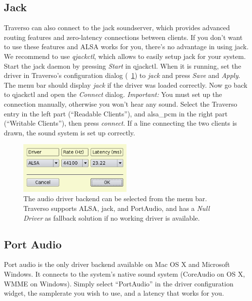 \subsection{Jack}
Traverso can also connect to the jack soundserver, which provides advanced routing features and zero-latency connections between clients. If you don't want to use these features and ALSA works for you, there's no advantage in using jack. We recommend to use \emph{qjackctl}, which allows to easily setup jack for your system. Start the jack daemon by pressing \emph{Start} in qjackctl. When it is running, set the driver in Traverso's configuration dialog (\FigB\ \ref{fig_driverconf}) to \emph{jack} and press \emph{Save} and \emph{Apply}. The menu bar should display \emph{jack} if the driver was loaded correctly. Now go back to qjackctl and open the \emph{Connect} dialog. \emph{Important:} You must set up the connection manually, otherwise you won't hear any sound. Select the Traverso entry in the left part (``Readable Clients''), and alsa\_pcm in the right part (``Writable Clients''), then press \emph{connect}. If a line connecting the two clients is drawn, the sound system is set up correctly.

\begin{figure}
 \centering\includegraphics[width=0.5\textwidth]{images/sshot02.png}
 \caption{The audio driver backend can be selected from the menu bar. Traverso supports ALSA, jack, and PortAudio, and has a \emph{Null Driver} as fallback solution if no working driver is available.}
 \label{fig_driverconf}
\end{figure}

\subsection{Port Audio}
Port audio is the only driver backend available on Mac OS X and Microsoft Windows. It connects to the system's native sound system (CoreAudio on OS X, WMME on Windows). Simply select ``PortAudio'' in the driver configuration widget, the samplerate you wish to use, and a latency that works for you.

